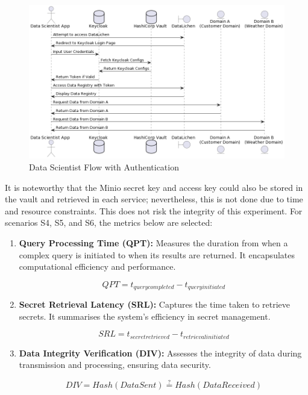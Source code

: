 \documentclass[preprint,12pt]{elsarticle}
\begin{document}
\begin{figure}[ht]

  \centering

  \includegraphics[width=\textwidth]{images/data-scientist-data-lichen-flow-with-authentication.jpg}

  \caption{Data Scientist Flow with Authentication}

  \label{dataScientistFlowWithAuthentication}

\end{figure}

It is noteworthy that the Minio secret key and access key could also be stored in the vault and retrieved in each service; nevertheless, this is not done due to time and resource constraints. This does not risk the integrity of this experiment. For scenarios S4, S5, and S6, the metrics below are selected: 

\begin{enumerate}

  \item \textbf{Query Processing Time (QPT):} Measures the duration from when a complex query is initiated to when its results are returned. It encapsulates computational efficiency and performance.

  \begin{equation}
      QPT = t_{query completed} - t_{query initiated}
  \end{equation}

  \item \textbf{Secret Retrieval Latency (SRL):} Captures the time taken to retrieve secrets. It summarises the system's efficiency in secret management.

  \begin{equation}
      SRL = t_{secret retrieved} - t_{retrieval initiated}
  \end{equation}

  \item \textbf{Data Integrity Verification (DIV):} Assesses the integrity of data during transmission and processing, ensuring data security.

  \begin{equation}
      DIV = Hash(Data Sent) \stackrel{?}{=} Hash(Data Received)
  \end{equation}

\end{enumerate}
\end{document}

